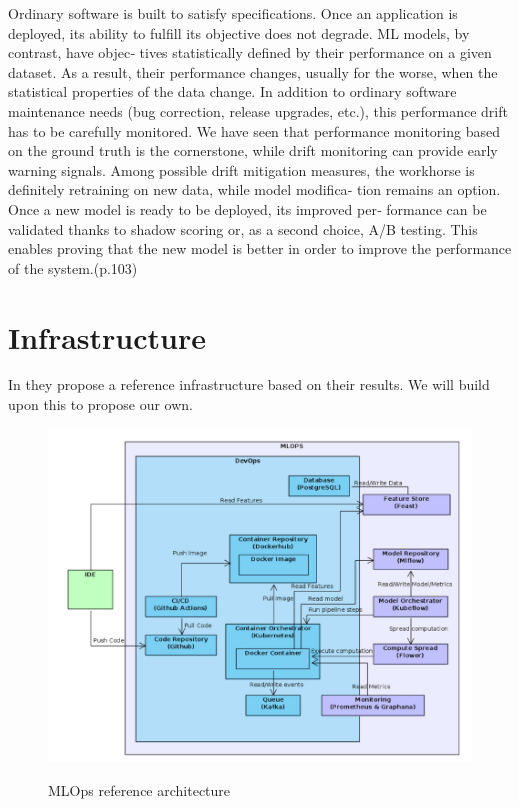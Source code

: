 Ordinary software is built to satisfy specifications. Once an application is deployed,
its ability to fulfill its objective does not degrade. ML models, by contrast, have objec‐
tives statistically defined by their performance on a given dataset. As a result, their
performance changes, usually for the worse, when the statistical properties of the data
change.
In addition to ordinary software maintenance needs (bug correction, release
upgrades, etc.), this performance drift has to be carefully monitored. We have seen
that performance monitoring based on the ground truth is the cornerstone, while
drift monitoring can provide early warning signals. Among possible drift mitigation
measures, the workhorse is definitely retraining on new data, while model modifica‐
tion remains an option. Once a new model is ready to be deployed, its improved per‐
formance can be validated thanks to shadow scoring or, as a second choice, A/B
testing. This enables proving that the new model is better in order to improve the
performance of the system.\cite{treveil2020introducing}(p.103)


\section{Infrastructure}
In\cite{10855428} they propose a reference infrastructure based on their results.
We will build upon this to propose our own.


\begin{figure}[!htbp]
    \caption{MLOps reference architecture\cite{10855428}}
    \centering
    \includegraphics[scale=0.5]{images/infrastructure}
    \label{fig:infra}
\end{figure}



